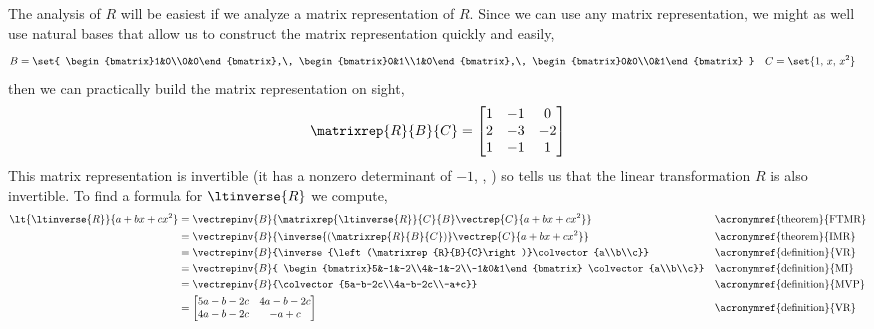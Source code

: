 The analysis of $R$ will be easiest if we analyze a matrix representation of $R$.  Since we can use any matrix representation, we might as well use natural bases that allow us to construct the matrix representation quickly and easily,
%
\begin{align*}
B&=\set{
\begin{bmatrix}1&0\\0&0\end{bmatrix},\,
\begin{bmatrix}0&1\\1&0\end{bmatrix},\,
\begin{bmatrix}0&0\\0&1\end{bmatrix}
}
&
C&=\set{1,\,x,\,x^2}
\end{align*}
%
then we can practically build the matrix representation on sight,
%
\begin{equation*}
\matrixrep{R}{B}{C}=
\begin{bmatrix}
1 & -1 & 0\\
2 & -3 & -2\\
1 & -1 & 1
\end{bmatrix}
\end{equation*}
%
This matrix representation is invertible (it has a nonzero determinant of $-1$, , ) so  tells us that the linear transformation $R$ is also invertible.  To find a formula for $\ltinverse{R}$  we compute,
%
\begin{align*}
\lt{\ltinverse{R}}{a+bx+cx^2}
&=\vectrepinv{B}{\matrixrep{\ltinverse{R}}{C}{B}\vectrep{C}{a+bx+cx^2}}&&\text{\acronymref{theorem}{FTMR}}\\
&=\vectrepinv{B}{\inverse{\left(\matrixrep{R}{B}{C}\right)}\vectrep{C}{a+bx+cx^2}}&&\text{\acronymref{theorem}{IMR}}\\
&=\vectrepinv{B}{\inverse{\left(\matrixrep{R}{B}{C}\right)}\colvector{a\\b\\c}}&&\text{\acronymref{definition}{VR}}\\
&=\vectrepinv{B}{
\begin{bmatrix}5&-1&-2\\4&-1&-2\\-1&0&1\end{bmatrix}
\colvector{a\\b\\c}}&&\text{\acronymref{definition}{MI}}\\
&=\vectrepinv{B}{\colvector{5a-b-2c\\4a-b-2c\\-a+c}}&&\text{\acronymref{definition}{MVP}}\\
&=\begin{bmatrix}5a-b-2c&4a-b-2c\\4a-b-2c&-a+c\end{bmatrix}&&\text{\acronymref{definition}{VR}}
\end{align*}
